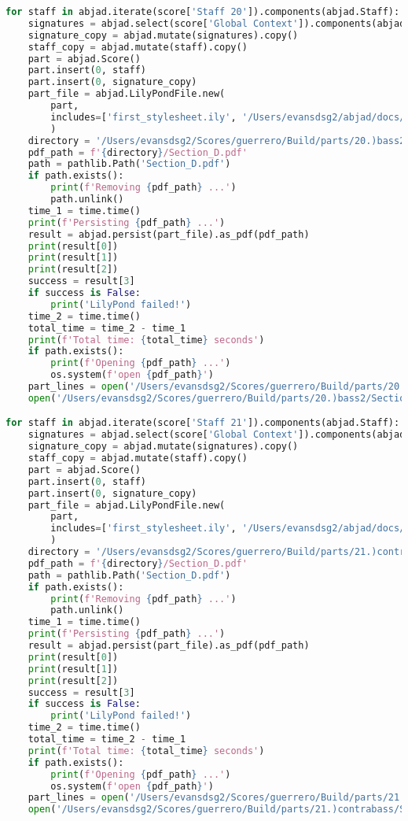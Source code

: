 \begin{lstlisting}[language=Python, caption=Invocation Source Code]
for staff in abjad.iterate(score['Staff 20']).components(abjad.Staff):
    signatures = abjad.select(score['Global Context']).components(abjad.Staff)
    signature_copy = abjad.mutate(signatures).copy()
    staff_copy = abjad.mutate(staff).copy()
    part = abjad.Score()
    part.insert(0, staff)
    part.insert(0, signature_copy)
    part_file = abjad.LilyPondFile.new(
        part,
        includes=['first_stylesheet.ily', '/Users/evansdsg2/abjad/docs/source/_stylesheets/abjad.ily'],
        )
    directory = '/Users/evansdsg2/Scores/guerrero/Build/parts/20.)bass2'
    pdf_path = f'{directory}/Section_D.pdf'
    path = pathlib.Path('Section_D.pdf')
    if path.exists():
        print(f'Removing {pdf_path} ...')
        path.unlink()
    time_1 = time.time()
    print(f'Persisting {pdf_path} ...')
    result = abjad.persist(part_file).as_pdf(pdf_path)
    print(result[0])
    print(result[1])
    print(result[2])
    success = result[3]
    if success is False:
        print('LilyPond failed!')
    time_2 = time.time()
    total_time = time_2 - time_1
    print(f'Total time: {total_time} seconds')
    if path.exists():
        print(f'Opening {pdf_path} ...')
        os.system(f'open {pdf_path}')
    part_lines = open('/Users/evansdsg2/Scores/guerrero/Build/parts/20.)bass2/Section_D.ly').readlines()
    open('/Users/evansdsg2/Scores/guerrero/Build/parts/20.)bass2/Section_D.ly', 'w').writelines(part_lines[15:-1])

for staff in abjad.iterate(score['Staff 21']).components(abjad.Staff):
    signatures = abjad.select(score['Global Context']).components(abjad.Staff)
    signature_copy = abjad.mutate(signatures).copy()
    staff_copy = abjad.mutate(staff).copy()
    part = abjad.Score()
    part.insert(0, staff)
    part.insert(0, signature_copy)
    part_file = abjad.LilyPondFile.new(
        part,
        includes=['first_stylesheet.ily', '/Users/evansdsg2/abjad/docs/source/_stylesheets/abjad.ily'],
        )
    directory = '/Users/evansdsg2/Scores/guerrero/Build/parts/21.)contrabass'
    pdf_path = f'{directory}/Section_D.pdf'
    path = pathlib.Path('Section_D.pdf')
    if path.exists():
        print(f'Removing {pdf_path} ...')
        path.unlink()
    time_1 = time.time()
    print(f'Persisting {pdf_path} ...')
    result = abjad.persist(part_file).as_pdf(pdf_path)
    print(result[0])
    print(result[1])
    print(result[2])
    success = result[3]
    if success is False:
        print('LilyPond failed!')
    time_2 = time.time()
    total_time = time_2 - time_1
    print(f'Total time: {total_time} seconds')
    if path.exists():
        print(f'Opening {pdf_path} ...')
        os.system(f'open {pdf_path}')
    part_lines = open('/Users/evansdsg2/Scores/guerrero/Build/parts/21.)contrabass/Section_D.ly').readlines()
    open('/Users/evansdsg2/Scores/guerrero/Build/parts/21.)contrabass/Section_D.ly', 'w').writelines(part_lines[15:-1])
\end{lstlisting}
